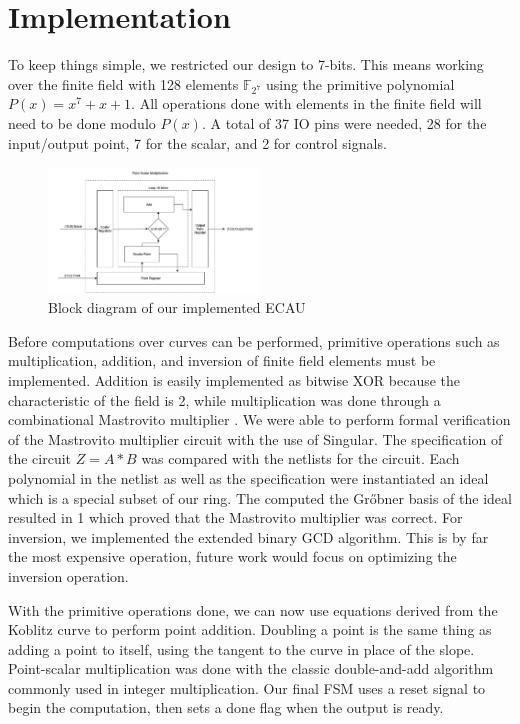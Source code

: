 \documentclass{IEEEtran}
\begin{document}
\section{Implementation}

To keep things simple, we restricted our design to 7-bits. This means working over the finite field with 128 elements $\mathbb{F}_{2^7}$ using the primitive polynomial $P(x) = x^7 + x + 1$. All operations done with elements in the finite field will need to be done modulo $P(x)$. A total of 37 IO pins were needed, 28 for the input/output point, 7 for the scalar, and 2 for control signals. 

\begin{figure}%
\centering
\captionsetup{justification=centering}
\includegraphics[width=0.5\textwidth]{images/blockdiagram.png}
\caption{Block diagram of our implemented ECAU}
\label{block}
\end{figure}

Before computations over curves can be performed, primitive operations such as multiplication, addition, and inversion of finite field elements must be implemented. Addition is easily implemented as bitwise XOR because the characteristic of the field is 2, while multiplication was done through a combinational Mastrovito multiplier \cite{Kallabook}. We were able to perform formal verification of the Mastrovito multiplier circuit with the use of Singular. The specification of the circuit $Z=A*B$ was compared with the netlists for the circuit. Each polynomial in the netlist as well as the specification were instantiated an ideal which is a special subset of our ring. The computed the Gr{\H o}bner basis of the ideal resulted in 1 which proved that the Mastrovito multiplier was correct. For inversion, we implemented the extended binary GCD algorithm. This is by far the most expensive operation, future work would focus on optimizing the inversion operation.

With the primitive operations done, we can now use equations derived from the Koblitz curve to perform point addition. Doubling a point is the same thing as adding a point to itself, using the tangent to the curve in place of the slope. Point-scalar multiplication was done with the classic double-and-add algorithm commonly used in integer multiplication. Our final FSM uses a reset signal to begin the computation, then sets a done flag when the output is ready. 
\end{document}
